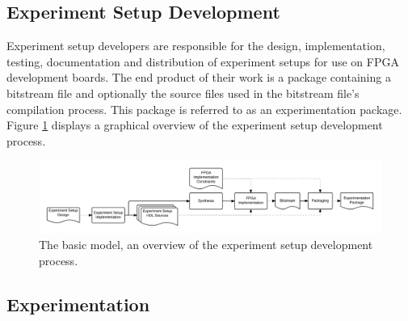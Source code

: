 \documentclass[main.tex]{subfiles}
\begin{document}
\subsection{Experiment Setup Development}
\label{sectionexperimentdevelopers}
Experiment setup developers are responsible for the design, implementation, testing, documentation and distribution of experiment setups for use on FPGA development boards. The end product of their work is a package containing a bitstream file and optionally the source files used in the bitstream file's compilation process. This package is referred to as an experimentation package. Figure \ref{fig:process-development-basic} displays a graphical overview of the experiment setup development process. 

\begin{figure}[h]
    \centering
    \caption{The basic model, an overview of the experiment setup development process.}
    \label{fig:process-development-basic}
    \includegraphics[width=\textwidth]{img/processes-basic-development}
\end{figure}




\subsection{Experimentation}
\end{document}
